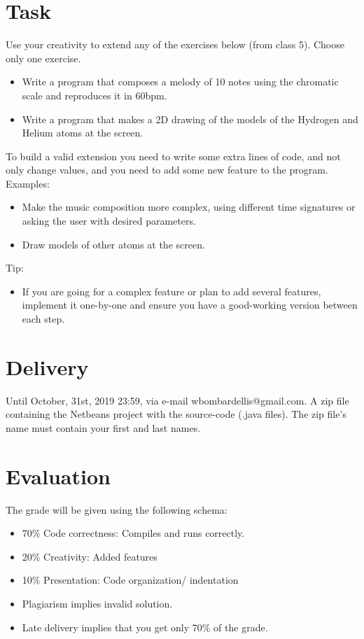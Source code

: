 \documentclass[a4paper]{article}
\begin{document}
	
	
	
	\section{Task}
	Use your creativity to extend any of the exercises below (from class 5). Choose only one exercise.
	\begin{itemize}
		\item Write a program that composes a melody of 10 notes using the chromatic scale and reproduces it in 60bpm.
		\item Write a program that makes a 2D drawing of the models of the Hydrogen and Helium atoms at the screen.
	\end{itemize}
	To build a valid extension you need to write some extra lines of code, and not only change values, and you need to add some new feature to the program. Examples:
	\begin{itemize}
		\item Make the music composition more complex, using different time signatures or asking the user with desired parameters.
		\item Draw models of other atoms at the screen.
	\end{itemize}
	Tip:
	\begin{itemize}
		\item If you are going for a complex feature or plan to add several features, implement it one-by-one and ensure you have a good-working version between each step.
	\end{itemize}
	
	\section{Delivery}
	Until October, 31st, 2019 23:59, via e-mail wbombardellis@gmail.com. A zip file containing the Netbeans project with the source-code (.java files). The zip file's name must contain your first and last names.	

	\section{Evaluation}
	The grade will be given using the following schema:
	\begin{itemize}
		\item 70\% Code correctness: Compiles and runs correctly.
		\item 20\% Creativity: Added features
		\item 10\% Presentation: Code organization/ indentation
	\end{itemize}
	\par \par
	\begin{itemize}
		\item Plagiarism implies invalid solution.
		\item Late delivery implies that you get only 70\% of the grade.
	\end{itemize}
\end{document}
